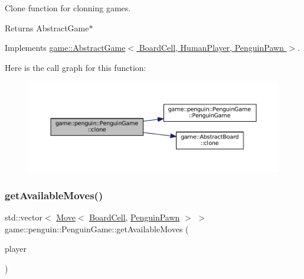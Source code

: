 Clone function for clonning games. 

\begin{DoxyReturn}{Returns}
Abstract\+Game$\ast$ 
\end{DoxyReturn}


Implements \hyperlink{classgame_1_1_abstract_game_a226baac1f32a8f6672d922675ffddbf6}{game\+::\+Abstract\+Game$<$ Board\+Cell, Human\+Player, Penguin\+Pawn $>$}.

Here is the call graph for this function\+:
\nopagebreak
\begin{figure}[H]
\begin{center}
\leavevmode
\includegraphics[width=350pt]{classgame_1_1penguin_1_1_penguin_game_af4277cfe44814a9b99051348f25ce264_cgraph}
\end{center}
\end{figure}
\mbox{\label{classgame_1_1penguin_1_1_penguin_game_ae92f96626c8d88f77279b6a76822fbe0}} 
\subsubsection{\texorpdfstring{get\+Available\+Moves()}{getAvailableMoves()}}
{\footnotesize\ttfamily std\+::vector$<$ \hyperlink{structgame_1_1_move}{Move}$<$ \hyperlink{classgame_1_1penguin_1_1_board_cell}{Board\+Cell}, \hyperlink{classgame_1_1penguin_1_1_penguin_pawn}{Penguin\+Pawn} $>$ $>$ game\+::penguin\+::\+Penguin\+Game\+::get\+Available\+Moves (\begin{DoxyParamCaption}\item[{\hyperlink{classgame_1_1penguin_1_1_human_player}{Human\+Player} $\ast$}]{player }\end{DoxyParamCaption})\hspace{0.3cm}{\ttfamily [override]}}

